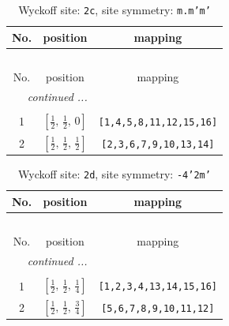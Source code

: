 \documentclass[fleqn,8pt]{jsarticle}
\begin{document}
\renewcommand{\arraystretch}{1.2}
\begin{longtable}{ccc}
\caption{Wyckoff site: {\tt 2c}, site symmetry: {\tt m.m'm'}}
 \\
 \hline \hline
No. & position & mapping \\ \hline \endfirsthead

\multicolumn{2}{l}{\tablename\ \thetable{}} \\
 \hline \hline
No. & position & mapping \\ \hline \endhead

 \hline \hline
\multicolumn{2}{r}{\footnotesize\it continued ...} \\ \endfoot

 \hline \hline
\multicolumn{2}{r}{} \\ \endlastfoot

1 & $\left[ \frac{1}{2},\, \frac{1}{2},\, 0 \right]$ & {\tt [1,4,5,8,11,12,15,16]} \\ \hline
2 & $\left[ \frac{1}{2},\, \frac{1}{2},\, \frac{1}{2} \right]$ & {\tt [2,3,6,7,9,10,13,14]} \\
\end{longtable}
\renewcommand{\arraystretch}{1.2}
\begin{longtable}{ccc}
\caption{Wyckoff site: {\tt 2d}, site symmetry: {\tt -4'2m'}}
 \\
 \hline \hline
No. & position & mapping \\ \hline \endfirsthead

\multicolumn{2}{l}{\tablename\ \thetable{}} \\
 \hline \hline
No. & position & mapping \\ \hline \endhead

 \hline \hline
\multicolumn{2}{r}{\footnotesize\it continued ...} \\ \endfoot

 \hline \hline
\multicolumn{2}{r}{} \\ \endlastfoot

1 & $\left[ \frac{1}{2},\, \frac{1}{2},\, \frac{1}{4} \right]$ & {\tt [1,2,3,4,13,14,15,16]} \\ \hline
2 & $\left[ \frac{1}{2},\, \frac{1}{2},\, \frac{3}{4} \right]$ & {\tt [5,6,7,8,9,10,11,12]} \\
\end{longtable}
\renewcommand{\arraystretch}{1.2}
\end{document}
